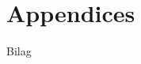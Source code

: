 \documentclass[../report.tex]{subfiles}
\begin{document}
\section{Appendices}

Bilag
\end{document}
